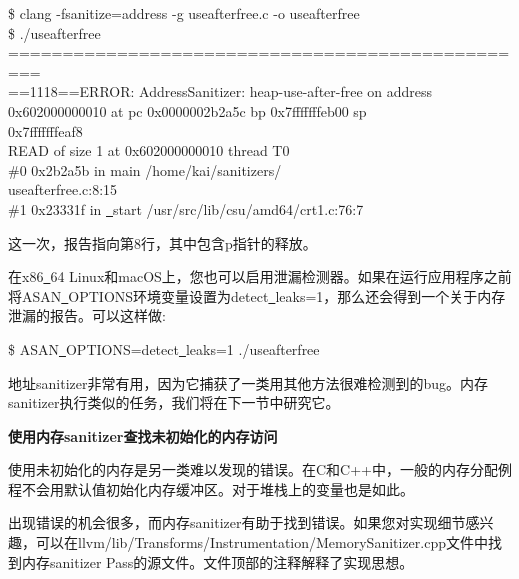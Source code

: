 \begin{tcolorbox}[colback=white,colframe=black]
\$ clang -fsanitize=address -g useafterfree.c -o useafterfree \\
\$ ./useafterfree \\
============================================== \\
=== \\
==1118==ERROR: AddressSanitizer: heap-use-after-free on address \\
0x602000000010 at pc 0x0000002b2a5c bp 0x7fffffffeb00 sp \\
0x7fffffffeaf8 \\
READ of size 1 at 0x602000000010 thread T0 \\
\hspace*{1cm}\#0 0x2b2a5b in main /home/kai/sanitizers/ \\
useafterfree.c:8:15 \\
\hspace*{1cm}\#1 0x23331f in \underline{~}start  /usr/src/lib/csu/amd64/crt1.c:76:7
\end{tcolorbox}

这一次，报告指向第8行，其中包含p指针的释放。\par

在x86\underline{~}64 Linux和macOS上，您也可以启用泄漏检测器。如果在运行应用程序之前将ASAN\underline{~}OPTIONS环境变量设置为detect\underline{~}leaks=1，那么还会得到一个关于内存泄漏的报告。可以这样做:\par

\begin{tcolorbox}[colback=white,colframe=black]
\$ ASAN\underline{~}OPTIONS=detect\underline{~}leaks=1 ./useafterfree
\end{tcolorbox}

地址sanitizer非常有用，因为它捕获了一类用其他方法很难检测到的bug。内存sanitizer执行类似的任务，我们将在下一节中研究它。\par

\hspace*{\fill} \par %
\textbf{使用内存sanitizer查找未初始化的内存访问}

使用未初始化的内存是另一类难以发现的错误。在C和C++中，一般的内存分配例程不会用默认值初始化内存缓冲区。对于堆栈上的变量也是如此。\par

出现错误的机会很多，而内存sanitizer有助于找到错误。如果您对实现细节感兴趣，可以在llvm/lib/Transforms/Instrumentation/MemorySanitizer.cpp文件中找到内存sanitizer Pass的源文件。文件顶部的注释解释了实现思想。\par

